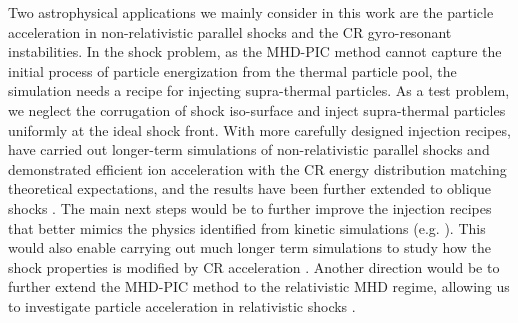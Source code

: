 \documentclass[fleqn,usenatbib]{mnras}
\begin{document}
Two astrophysical applications we mainly consider in this work are the particle acceleration in non-relativistic parallel shocks and the CR gyro-resonant instabilities. In the shock problem, as the MHD-PIC method cannot capture the initial process of particle energization from the thermal particle pool, the simulation needs a recipe for injecting supra-thermal particles. As a test problem, 
we neglect the corrugation of shock iso-surface and inject supra-thermal particles uniformly at the ideal shock front.
With more carefully designed injection recipes,
\citet{2015ApJ...809...55B, 2018ApJ...859...13M, 2018MNRAS.473.3394V}  have carried out longer-term simulations of non-relativistic parallel shocks and demonstrated efficient ion acceleration with the CR energy distribution matching theoretical expectations, and the results have been further extended to oblique shocks \citep{2018MNRAS.473.3394V, 2022ApJ...929....7V}.
The main next steps would be to further improve the injection recipes that better mimics the physics identified from kinetic simulations (e.g. \citealp{2013ApJ...773..158G, 2015ApJ...798L..28C}). This would also enable carrying out much longer term simulations to study how the shock properties is modified by CR acceleration \citep[][]{2015ApJ...809...55B, 2020ApJ...905....1H, 2020ApJ...905....2C}. Another direction would be to further extend the MHD-PIC method to the relativistic MHD regime, allowing us to investigate particle acceleration in relativistic shocks \citep[e.g. ][]{2011ApJ...726...75S}.
\end{document}
